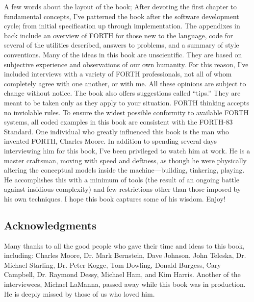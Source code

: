 A few words about the layout of the book; After devoting the first
chapter to fundamental concepts, I've patterned the book after the
software development cycle; from initial specification up through
implementation. The appendixes in back include an overview of FORTH
for those new to the language, code for several of the utilities described,
answers to problems, and a summary of style conventions. Many of the
ideas in this book are unscientific. They are based on subjective
experience and observations of our own humanity. For this reason,
I've included interviews with a variety of FORTH professionals, not
all of whom completely agree with one another, or with me. All these
opinions are subject to change without notice. The book also offers
suggestions called ``tips.'' They are meant to be taken only as they
apply to your situation. FORTH thinking accepts no inviolable rules.
To ensure the widest possible conformity to available FORTH systems,
all coded examples in this book are consistent with the FORTH-83 Standard.
One individual who greatly influenced this book is the man who invented
FORTH, Charles Moore. In addition to spending several days interviewing
him for this book, I've been privileged to watch him at work. He is
a master craftsman, moving with speed and deftness, as though he were
physically altering the conceptual models inside the machine---building,
tinkering, playing. He accomplishes this with a minimum of tools (the
result of an ongoing battle against insidious complexity) and few
restrictions other than those imposed by his own techniques. I hope
this book captures some of his wisdom. Enjoy!


\subsection{Acknowledgments}

Many thanks to all the good people who gave their time and ideas to
this book, including: Charles Moore, Dr. Mark Bernstein, Dave Johnson,
John Teleska, Dr. Michael Starling, Dr. Peter Kogge, Tom Dowling,
Donald Burgess, Cary Campbell, Dr. Raymond Dessy, Michael Ham, and
Kim Harris. Another of the interviewees, Michael LaManna, passed away
while this book was in production. He is deeply missed by those of
us who loved him. 

